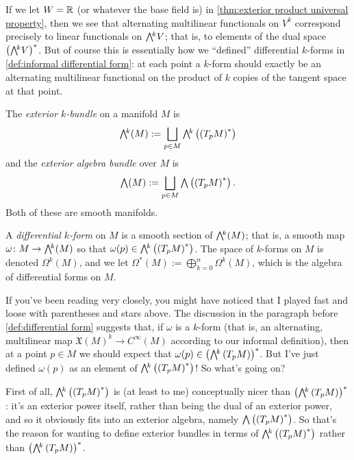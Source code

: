 If we let $W = \mathbb{R}$ (or whatever the base field is) in \cref{thm:exterior product universal property}, then we see that alternating multilinear functionals on $V^k$ correspond precisely to linear functionals on $\ext{k}V$; that is, to elements of the dual space $\left(\ext{k}V\right)^\ast$. But of course this is essentially how we ``defined'' differential $k$-forms in \cref{def:informal differential form}: at each point a $k$-form should exactly be an alternating multilinear functional on the product of $k$ copies of the tangent space at that point.

\begin{definition}\label{def:differential form}
	The \emph{exterior $k$-bundle} on a manifold $M$ is
	\[
		\ext{k}(M) := \bigsqcup_{p \in M} \ext{k}\left(\left(T_pM\right)^\ast\right)
	\]
	and the \emph{exterior algebra bundle} over $M$ is
	\[
		\ext{} (M) := \bigsqcup_{p \in M} \ext{} \left(\left(T_pM\right)^\ast\right).
	\]
	Both of these are smooth manifolds.
	
	A \emph{differential $k$-form} on $M$ is a smooth section of $\ext{k}(M)$; that is, a smooth map $\omega\from M \to \ext{k}(M)$ so that $\omega(p) \in \ext{k}\left(\left(T_pM\right)^\ast\right)$. The space of $k$-forms on $M$ is denoted $\Omega^k(M)$, and we let $\Omega^\ast(M) := \displaystyle \bigoplus_{k=0}^n \Omega^k(M)$, which is the algebra of differential forms on $M$.
\end{definition}

If you've been reading very closely, you might have noticed that I played fast and loose with parentheses and stars above. The discussion in the paragraph before \cref{def:differential form} suggests that, if $\omega$ is a $k$-form (that is, an alternating, multilinear map $\mathfrak{X}(M)^k \to C^\infty(M)$ according to our informal definition), then at a point $p \in M$ we should expect that $\omega(p) \in \left(\ext{k}\left(T_pM\right)\right)^\ast$. But I've just defined $\omega(p)$ as an element of $\ext{k}\left(\left(T_pM\right)^\ast \right)$! So what's going on?

First of all, $\ext{k}\left(\left(T_pM\right)^\ast \right)$ is (at least to me) conceptually nicer than $\left(\ext{k}\left(T_pM\right)\right)^\ast$: it's an exterior power itself, rather than being the dual of an exterior power, and so it obviously fits into an exterior algebra, namely $\ext{}\left(\left(T_pM\right)^\ast\right)$. So that's the reason for wanting to define exterior bundles in terms of $\ext{k}\left(\left(T_pM\right)^\ast\right)$ rather than $\left(\ext{k}\left(T_pM\right)\right)^\ast$.

